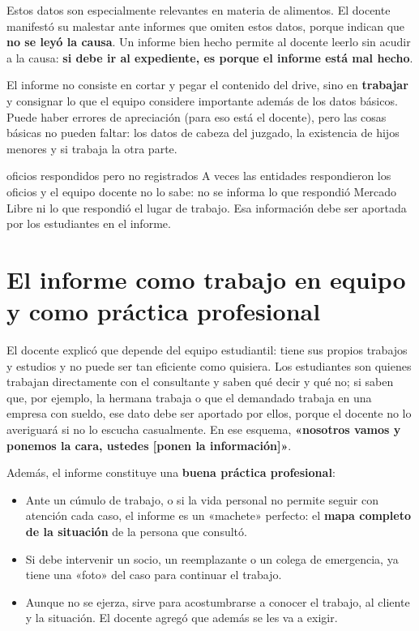 \documentclass[12pt,oneside]{book}
\begin{document}
Estos datos son especialmente relevantes en materia de alimentos. El docente manifestó su malestar ante informes que omiten estos datos, porque indican que \textbf{no se leyó la causa}. Un informe bien hecho permite al docente leerlo sin acudir a la causa: \textbf{si debe ir al expediente, es porque el informe está mal hecho}.

\begin{important}
El informe no consiste en cortar y pegar el contenido del drive, sino en \textbf{trabajar} y consignar lo que el equipo considere importante además de los datos básicos. Puede haber errores de apreciación (para eso está el docente), pero las cosas básicas no pueden faltar: los datos de cabeza del juzgado, la existencia de hijos menores y si trabaja la otra parte.
\end{important}

\begin{example}{oficios respondidos pero no registrados}
A veces las entidades respondieron los oficios y el equipo docente no lo sabe: no se informa lo que respondió Mercado Libre ni lo que respondió el lugar de trabajo. Esa información debe ser aportada por los estudiantes en el informe.
\end{example}

\section{El informe como trabajo en equipo y como práctica profesional}

El docente explicó que depende del equipo estudiantil: tiene sus propios trabajos y estudios y no puede ser tan eficiente como quisiera. Los estudiantes son quienes trabajan directamente con el consultante y saben qué decir y qué no; si saben que, por ejemplo, la hermana trabaja o que el demandado trabaja en una empresa con sueldo, ese dato debe ser aportado por ellos, porque el docente no lo averiguará si no lo escucha casualmente. En ese esquema, \textbf{«nosotros vamos y ponemos la cara, ustedes [ponen la información]»}.

Además, el informe constituye una \textbf{buena práctica profesional}:

\begin{itemize}
    \item Ante un cúmulo de trabajo, o si la vida personal no permite seguir con atención cada caso, el informe es un «machete» perfecto: el \textbf{mapa completo de la situación} de la persona que consultó.
    \item Si debe intervenir un socio, un reemplazante o un colega de emergencia, ya tiene una «foto» del caso para continuar el trabajo.
    \item Aunque no se ejerza, sirve para acostumbrarse a conocer el trabajo, al cliente y la situación. El docente agregó que además se les va a exigir.
\end{itemize}
\end{document}
